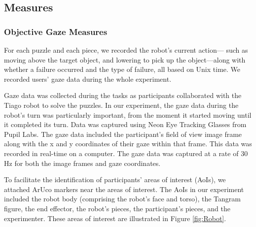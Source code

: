 \subsection{Measures}
\subsubsection{Objective Gaze Measures}\label{gaze_measures}

For each puzzle and each piece, we recorded the robot’s current action— such as moving above the target object, and lowering to pick up the object—along with whether a failure occurred and the type of failure, all based on Unix time. We recorded users’ gaze data during the whole experiment.


Gaze data was collected during the tasks as participants collaborated with the Tiago robot to solve the puzzles. In our experiment, the gaze data during the robot's turn was particularly important, from the moment it started moving until it completed its turn. Data was captured using Neon Eye Tracking Glasses from Pupil Labs. The gaze data included the participant’s field of view image frame along with the x and y coordinates of their gaze within that frame. This data was recorded in real-time on a computer. The gaze data was captured at a rate of 30 Hz for both the image frames and gaze coordinates.


To facilitate the identification of participants' areas of interest (AoIs), we attached ArUco markers near the areas of interest. The AoIs in our experiment included the robot body (comprising the robot's face and torso), the Tangram figure, the end effector, the robot’s pieces, the participant’s pieces, and the experimenter. These areas of interest are illustrated in Figure \ref{fig:Robot}.




